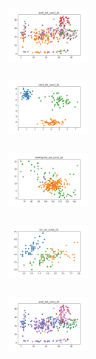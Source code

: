 \begin{figure}[H]
\begin{subfigure}
    \end{subfigure}
    \hfill
    \begin{subfigure}
        \centering
        \includegraphics[width=0.234\textwidth]{img/am10/ecoli_set_const_20_589741062_clust.png}
    \end{subfigure}
    \hfill
    \begin{subfigure}
        \centering
        \includegraphics[width=0.234\textwidth]{img/am10/rand_set_const_20_589741062_clust.png}
    \end{subfigure}
    \hfill
    \begin{subfigure}
        \centering
        \includegraphics[width=0.234\textwidth]{img/am10/newthyroid_set_const_20_589741062_clust.png}
    \end{subfigure}
    \hfill
    \begin{subfigure}
        \centering
        \includegraphics[width=0.234\textwidth]{img/am10/iris_set_const_20_277451237_clust.png}
    \end{subfigure}
    \hfill
    \begin{subfigure}
        \centering
        \includegraphics[width=0.234\textwidth]{img/am10/ecoli_set_const_20_277451237_clust.png}
    \end{subfigure}
    \hfill

\end{figure}
